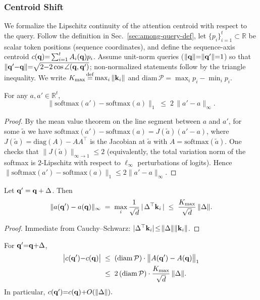 \subsubsection{Centroid Shift}
\label{sec:centroid-shift}

We formalize the Lipschitz continuity of the attention centroid with respect to the query. Follow the definition in Sec.~\ref{sec:among-query-def}, let $\{p_i\}_{i=1}^t\subset\mathbb{R}$ be scalar token positions (sequence coordinates), and define the sequence-axis centroid $c(\mathbf{q}){=} \sum_{i=1}^t A_i(\mathbf{q})p_i$. Assume unit-norm queries ($\|\mathbf{q}\|{=}\|\mathbf{q}'\|{=}1$) so that $\|\mathbf{q}'{-}\mathbf{q}\|{=} \sqrt{2 {-} 2 \cos \angle(\mathbf{q},\mathbf{q}')}$; non-normalized statements follow by the triangle inequality. We write $K_{\max}\!\stackrel{\mathrm{def}}{=}\!\max_i\|\mathbf{k}_i\|$ and $\mathrm{diam}\,\mathcal{P}{=}\max_i p_i-\min_i p_i$.

\begin{lemma}
\label{lem:softmax-lip}
For any $a,a'\in\mathbb{R}^t$,
\[
\big \|\mathrm{softmax}(a')-\mathrm{softmax}(a)\big\|_1
\;\le\; 2\,\|a'-a\|_\infty.
\]
\end{lemma}

\begin{proof}
By the mean value theorem on the line segment between $a$ and $a'$, for some $\tilde a$ we have
$\mathrm{softmax}(a')- \mathrm{softmax}(a)= J(\tilde a)(a'-a)$, where
$J(\tilde a){=}\mathrm{diag}(A){-}AA^\top$ is the Jacobian at $\tilde a$ with
$A{=}\mathrm{softmax}(\tilde a)$. One checks that $\|J(\tilde a)\|_{\infty{\to}1}{\le} 2$ (equivalently, the total variation norm of the
softmax is $2$-Lipschitz with respect to $\ell_\infty$ perturbations of logits). Hence
$\|\mathrm{softmax}(a') {-} \mathrm{softmax}(a)\|_1 {\le} 2 \|a'-a\|_\infty$.
\end{proof}

\begin{lemma}
\label{lem:logit-perturb}
Let $\mathbf{q}'=\mathbf{q}+\Delta$. Then
\[
\|a(\mathbf{q}')-a(\mathbf{q})\|_\infty
\;=\;
\max_{i}\frac{1}{\sqrt d}\,|\,\Delta^\top \mathbf{k}_i\,|
\;\le\; \frac{K_{\max}}{\sqrt d}\,\|\Delta\|.
\]
\end{lemma}

\begin{proof}
Immediate from Cauchy–Schwarz: $|\Delta^\top \mathbf{k}_i| \!\le\! \|\Delta\|\|\mathbf{k}_i\|$.
\end{proof}

\begin{theorem}
\label{thm:centroid-lip}
For $\mathbf{q}'{=}\mathbf{q}{+}\Delta$,
\begin{equation}
\begin{aligned}
\big|c(\mathbf{q}'){-}c(\mathbf{q})\big|
&\;\le\;
(\mathrm{diam}\,\mathcal{P})\cdot
\big\|A(\mathbf{q}')-A(\mathbf{q})\big\|_1 \\
&\;\le\;
2\,(\mathrm{diam}\,\mathcal{P})\cdot \frac{K_{\max}}{\sqrt d}\,\|\Delta\|.
\end{aligned}
\end{equation}
In particular, $c(\mathbf{q}') {=} c(\mathbf{q}) {+} O(\|\Delta\|).$
\end{theorem}

